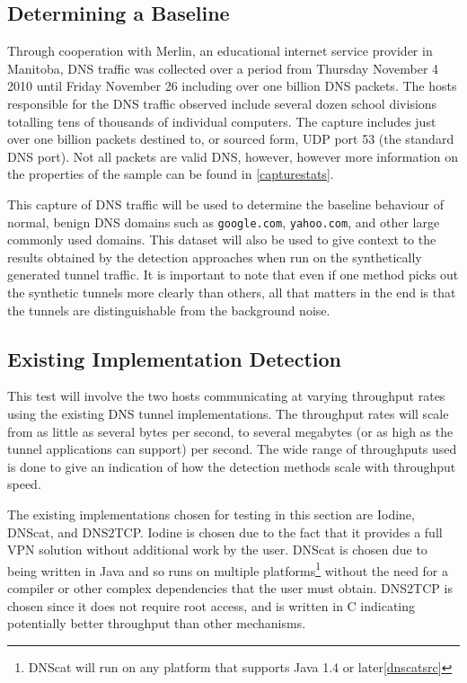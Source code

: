 \documentclass[12pt]{report}
\theoremstyle{remark}
\theoremstyle{definition}
\theoremstyle{definition}
\theoremstyle{definition}
\begin{document}
\subsection{Determining a Baseline}
\label{baselinetest}
Through cooperation with Merlin, an educational internet service provider in Manitoba, DNS traffic was collected over a period from Thursday November 4 2010 until Friday November 26 including over one billion DNS packets. The hosts responsible for the DNS traffic observed include several dozen school divisions totalling tens of thousands of individual computers. The capture includes just over one billion packets destined to, or sourced form, UDP port 53 (the standard DNS port). Not all packets are valid DNS, however, however more information on the properties of the sample can be found in \ref{capturestats}.

This capture of DNS traffic will be used to determine the baseline behaviour of normal, benign DNS domains such as \texttt{google.com}, \texttt{yahoo.com}, and other large commonly used domains. This dataset will also be used to give context to the results obtained by the detection approaches when run on the synthetically generated tunnel traffic. It is important to note that even if one method picks out the synthetic tunnels more clearly than others, all that matters in the end is that the tunnels are distinguishable from the background noise.

\subsection{Existing Implementation Detection}
\label{existingtest}
This test will involve the two hosts communicating at varying throughput rates using the existing DNS tunnel implementations. The throughput rates will scale from as little as several bytes per second, to several megabytes (or as high as the tunnel applications can support) per second. The wide range of throughputs used is done to give an indication of how the detection methods scale with throughput speed.

The existing implementations chosen for testing in this section are Iodine\cite{iodinesrc}, DNScat\cite{dnscatsrc}, and DNS2TCP\cite{dns2tcpsrc}. Iodine is chosen due to the fact that it provides a full VPN solution without additional work by the user. DNScat is chosen due to being written in Java and so runs on multiple platforms\footnote{DNScat will run on any platform that supports Java 1.4 or later\ref{dnscatsrc}} without the need for a compiler or other complex dependencies that the user must obtain. DNS2TCP is chosen since it does not require root access, and is written in C indicating potentially better throughput than other mechanisms.
\end{document}
